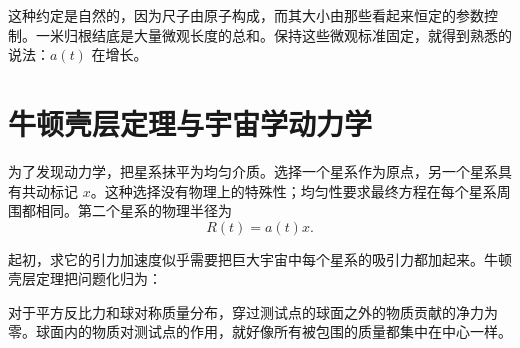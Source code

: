 \begin{classroomqa}
\end{classroomqa}

这种约定是自然的，因为尺子由原子构成，而其大小由那些看起来恒定的参数控制。一米归根结底是大量微观长度的总和。保持这些微观标准固定，就得到熟悉的说法：\(a(t)\) 在增长。

\begin{classroomqa}
\end{classroomqa}

\begin{classroomqa}
\end{classroomqa}

\section{牛顿壳层定理与宇宙学动力学}

为了发现动力学，把星系抹平为均匀介质。选择一个星系作为原点，另一个星系具有共动标记 \(x\)。这种选择没有物理上的特殊性；均匀性要求最终方程在每个星系周围都相同。第二个星系的物理半径为
\begin{equation}
  R(t)=a(t)x.
  \label{eq:radius-ax}
\end{equation}

起初，求它的引力加速度似乎需要把巨大宇宙中每个星系的吸引力都加起来。牛顿壳层定理把问题化归为：

\begin{proposition}
对于平方反比力和球对称质量分布，穿过测试点的球面之外的物质贡献的净力为零。球面内的物质对测试点的作用，就好像所有被包围的质量都集中在中心一样。
\end{proposition}

